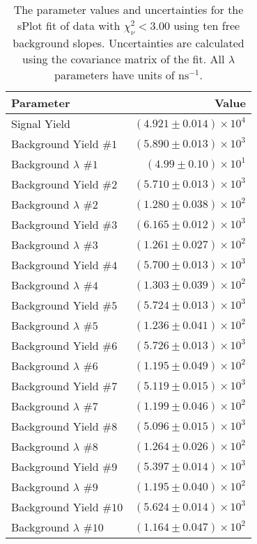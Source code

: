 
\begin{table}[ht]
    \begin{center}
        \begin{tabular}{lr}\toprule
            Parameter & Value \\\midrule
            Signal Yield & $(4.921 \pm 0.014) \times 10^{4}$ \\
            Background Yield $\#1$ & $(5.890 \pm 0.013) \times 10^{3}$ \\
            Background $\lambda$ $\#1$ & $(4.99 \pm 0.10) \times 10^{1}$ \\
            Background Yield $\#2$ & $(5.710 \pm 0.013) \times 10^{3}$ \\
            Background $\lambda$ $\#2$ & $(1.280 \pm 0.038) \times 10^{2}$ \\
            Background Yield $\#3$ & $(6.165 \pm 0.012) \times 10^{3}$ \\
            Background $\lambda$ $\#3$ & $(1.261 \pm 0.027) \times 10^{2}$ \\
            Background Yield $\#4$ & $(5.700 \pm 0.013) \times 10^{3}$ \\
            Background $\lambda$ $\#4$ & $(1.303 \pm 0.039) \times 10^{2}$ \\
            Background Yield $\#5$ & $(5.724 \pm 0.013) \times 10^{3}$ \\
            Background $\lambda$ $\#5$ & $(1.236 \pm 0.041) \times 10^{2}$ \\
            Background Yield $\#6$ & $(5.726 \pm 0.013) \times 10^{3}$ \\
            Background $\lambda$ $\#6$ & $(1.195 \pm 0.049) \times 10^{2}$ \\
            Background Yield $\#7$ & $(5.119 \pm 0.015) \times 10^{3}$ \\
            Background $\lambda$ $\#7$ & $(1.199 \pm 0.046) \times 10^{2}$ \\
            Background Yield $\#8$ & $(5.096 \pm 0.015) \times 10^{3}$ \\
            Background $\lambda$ $\#8$ & $(1.264 \pm 0.026) \times 10^{2}$ \\
            Background Yield $\#9$ & $(5.397 \pm 0.014) \times 10^{3}$ \\
            Background $\lambda$ $\#9$ & $(1.195 \pm 0.040) \times 10^{2}$ \\
            Background Yield $\#10$ & $(5.624 \pm 0.014) \times 10^{3}$ \\
            Background $\lambda$ $\#10$ & $(1.164 \pm 0.047) \times 10^{2}$ \\\bottomrule
        \end{tabular}
        \caption{The parameter values and uncertainties for the sPlot fit of data with $\chi^2_\nu < 3.00$ using ten free background slopes. Uncertainties are calculated using the covariance matrix of the fit. All $\lambda$ parameters have units of $\si{\nano\second}^{-1}$.}\label{tab:splot-fit-results-chisqdof-3.00-free-10}
    \end{center}
\end{table}
